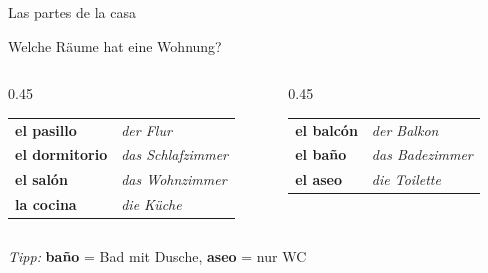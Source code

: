 \documentclass[aspectratio=169, 11pt]{beamer}
\newcommand{\seriftext}[1]{{\fontfamily{ppl}\selectfont #1}}
\newcommand{\es}[1]{\seriftext{\textbf{#1}}}
\newcommand{\de}[1]{\textit{\textcolor{mittelgrau}{#1}}}
\begin{document}
\begin{frame}{Las partes de la casa}
    \vspace{0.3cm}

    {\large Welche Räume hat eine Wohnung?}

    \vspace{0.5cm}

    \begin{columns}[T]
        \begin{column}{0.45\textwidth}
            \begin{tabular}{@{}ll@{}}
                \es{el pasillo} & \de{der Flur} \\[0.4em]
                \es{el dormitorio} & \de{das Schlafzimmer} \\[0.4em]
                \es{el salón} & \de{das Wohnzimmer} \\[0.4em]
                \es{la cocina} & \de{die Küche} \\
            \end{tabular}
        \end{column}

        \begin{column}{0.45\textwidth}
            \begin{tabular}{@{}ll@{}}
                \es{el balcón} & \de{der Balkon} \\[0.4em]
                \es{el baño} & \de{das Badezimmer} \\[0.4em]
                \es{el aseo} & \de{die Toilette} \\
            \end{tabular}
        \end{column}
    \end{columns}

    \vspace{0.8cm}

    {\small\textit{Tipp:} \es{baño} = Bad mit Dusche, \es{aseo} = nur WC}
\end{frame}
\end{document}
